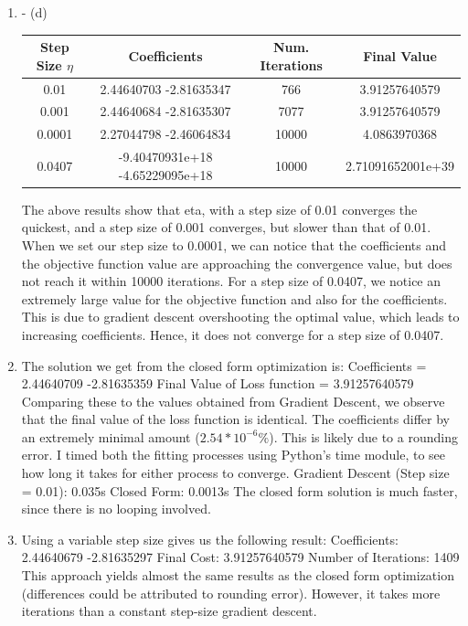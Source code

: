 \documentclass[11pt]{article}
\newcommand{\solution}[1]{{{\color{blue}{\bf Solution:} {#1}}}}
\begin{document}
\begin{enumerate}
\item - (d)
\solution{} \newline
\begin{tabular}{| c | c | c | c |}
\hline
Step Size $\eta$ & Coefficients & Num. Iterations & Final Value \\
\hline 
0.01 & 2.44640703 -2.81635347 & 766 & 3.91257640579 \\
\hline
0.001 & 2.44640684 -2.81635307 & 7077 & 3.91257640579 \\
\hline
0.0001 & 2.27044798 -2.46064834 & 10000  & 4.0863970368 \\
\hline
0.0407 &  -9.40470931e+18  -4.65229095e+18 & 10000 & 2.71091652001e+39 \\
\hline
\end{tabular}
The above results show that eta, with a step size of 0.01 converges the quickest, 
and a step size of 0.001 converges, but slower than that of 0.01. When we set our
step size to 0.0001, we can notice that the coefficients and the objective function
value are approaching the convergence value, but does not reach it within 10000 
iterations. \newline
For a step size of 0.0407, we notice an extremely large value for the objective 
function and also for the coefficients. This is due to gradient descent overshooting
the optimal value, which leads to increasing coefficients. Hence, it does not converge
for a step size of 0.0407.
\addtocounter{enumi}{2}

\item
\solution{} \newline
The solution we get from the closed form optimization is: \newline
Coefficients = 2.44640709 -2.81635359
Final Value of Loss function = 3.91257640579
Comparing these to the values obtained from Gradient Descent, we observe
that the final value of the loss function is identical. The coefficients
differ by an extremely minimal amount ($2.54 * 10^{-6} \%$). This is likely
due to a rounding error. \newline
I timed both the fitting processes using Python's time module, to see how
long it takes for either process to converge. 
Gradient Descent (Step size = 0.01): 0.035s
Closed Form: 0.0013s
The closed form solution is much faster, since there is no looping involved.

\item
\solution{} \newline
Using a variable step size gives us the following result: \newline
Coefficients: 2.44640679 -2.81635297 \newline
Final Cost: 3.91257640579 \newline
Number of Iterations: 1409 \newline
This approach yields almost the same results as the closed form optimization
(differences could be attributed to rounding error). However, it takes more
iterations than a constant step-size gradient descent.


\end{enumerate}
\end{document}
